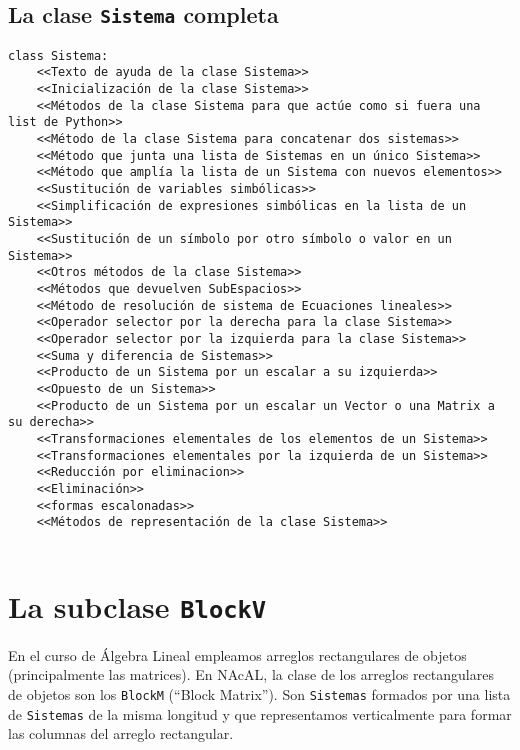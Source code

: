 \documentclass[11pt]{report}
\begin{document}
\clearpage

\section{La clase \texttt{Sistema} completa}
\label{sec:orgfcf061f}

\begin{verbatim}
class Sistema:
    <<Texto de ayuda de la clase Sistema>>
    <<Inicialización de la clase Sistema>>
    <<Métodos de la clase Sistema para que actúe como si fuera una list de Python>>
    <<Método de la clase Sistema para concatenar dos sistemas>>
    <<Método que junta una lista de Sistemas en un único Sistema>>
    <<Método que amplía la lista de un Sistema con nuevos elementos>>
    <<Sustitución de variables simbólicas>>
    <<Simplificación de expresiones simbólicas en la lista de un Sistema>>
    <<Sustitución de un símbolo por otro símbolo o valor en un Sistema>>
    <<Otros métodos de la clase Sistema>>
    <<Métodos que devuelven SubEspacios>>
    <<Método de resolución de sistema de Ecuaciones lineales>>
    <<Operador selector por la derecha para la clase Sistema>>
    <<Operador selector por la izquierda para la clase Sistema>>
    <<Suma y diferencia de Sistemas>>
    <<Producto de un Sistema por un escalar a su izquierda>>
    <<Opuesto de un Sistema>>
    <<Producto de un Sistema por un escalar un Vector o una Matrix a su derecha>>
    <<Transformaciones elementales de los elementos de un Sistema>>
    <<Transformaciones elementales por la izquierda de un Sistema>>
    <<Reducción por eliminacion>>
    <<Eliminación>>
    <<formas escalonadas>>
    <<Métodos de representación de la clase Sistema>>
    
\end{verbatim}


\chapter{La subclase \texttt{BlockV}}
\label{sec:orgd1ab61b}

En el curso de Álgebra Lineal empleamos arreglos rectangulares de
objetos (principalmente las matrices). En NAcAL, la clase de los
arreglos rectangulares de objetos son los \texttt{BlockM} (``Block
Matrix''). Son \texttt{Sistemas} formados por una lista de \texttt{Sistemas} de la
misma longitud y que representamos verticalmente para formar las
columnas del arreglo rectangular.
\end{document}
